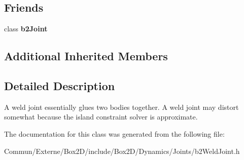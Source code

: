 \subsection*{Friends}
\begin{DoxyCompactItemize}
\item 
class {\bfseries b2\+Joint}\hypertarget{classb2_weld_joint_a54ade8ed3d794298108d7f4c4e4793fa}{}\label{classb2_weld_joint_a54ade8ed3d794298108d7f4c4e4793fa}

\end{DoxyCompactItemize}
\subsection*{Additional Inherited Members}


\subsection{Detailed Description}
A weld joint essentially glues two bodies together. A weld joint may distort somewhat because the island constraint solver is approximate. 

The documentation for this class was generated from the following file\+:\begin{DoxyCompactItemize}
\item 
Commun/\+Externe/\+Box2\+D/include/\+Box2\+D/\+Dynamics/\+Joints/b2\+Weld\+Joint.\+h\end{DoxyCompactItemize}
